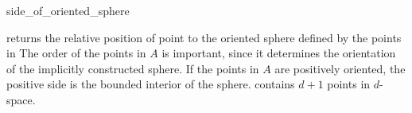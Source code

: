 \begin{ccRefFunction}{side_of_oriented_sphere}

 { returns the relative position of
  point  to the oriented sphere defined by the points in
  \ccc{A = tuple [first,last)} The order of the points in $A$ is
  important, since it determines the orientation of the implicitly
  constructed sphere.  If the points in $A$ are positively oriented,
  the positive side is the bounded interior of the sphere.  \ccPrecond
   contains $d+1$ points in $d$-space.  }

\end{ccRefFunction}


